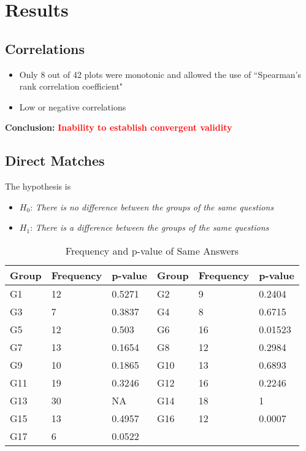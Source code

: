 \section{Results}

\subsection{Correlations}

\begin{itemize}
	\item Only 8 out of 42 plots were monotonic and allowed the use of  ``Spearman's rank correlation coefficient"
	\item Low or negative correlations
\end{itemize}

\textbf{Conclusion:} \textcolor{red}{\textbf{Inability to establish convergent validity}}

\clearpage

\subsection{Direct Matches}

The hypothesis is

\begin{itemize}[label={}]
	\item $H_0$: \textit{There is no difference between the groups of the same questions}
	\item $H_1$: \textit{There is a difference between the groups of the same questions}
\end{itemize}

\begin{table} [H]
	\begin{tabular}{| p{1cm} | p{1.5cm} | p{1.5cm} | p{2cm} | p{1.5cm} | p{1.5cm} |} \hline
		Group & Frequency & p-value & Group & Frequency & p-value \\ \hline
		G1 & 12 & 0.5271 & G2 & 9 & 0.2404 \\ \hline
		G3 & 7 & 0.3837 & G4 & 8 & 0.6715 \\ \hline
		G5 & 12 & 0.503 & G6 & 16 & 0.01523 \\ \hline
		G7 & 13 & 0.1654 & G8 & 12 & 0.2984 \\ \hline
		G9 & 10 & 0.1865 & G10 & 13 & 0.6893 \\ \hline
		G11 & 19 & 0.3246 & G12 & 16 & 0.2246 \\ \hline
		G13 & 30 & NA & G14 & 18 & 1 \\ \hline
		G15 & 13 & 0.4957 & G16 & 12 & 0.0007 \\ \hline
		G17 & 6 & 0.0522 & & & \\ \hline
	\end{tabular}
	\caption{Frequency and p-value of Same Answers}
	\label{table:answers_frequency}
\end{table}

